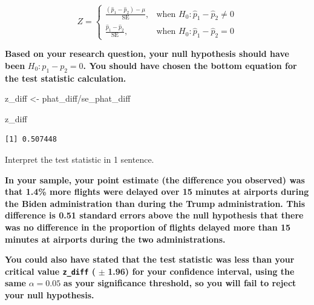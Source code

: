 \documentclass[
  letterpaper,
  DIV=11,
  numbers=noendperiod]{scrartcl}
\newenvironment{Shaded}{\begin{snugshade}}{\end{snugshade}}
\newcommand{\NormalTok}[1]{\textcolor[rgb]{0.00,0.23,0.31}{#1}}
\newcommand{\OtherTok}[1]{\textcolor[rgb]{0.00,0.23,0.31}{#1}}
\newcommand{\SpecialCharTok}[1]{\textcolor[rgb]{0.37,0.37,0.37}{#1}}
\begin{document}
\[
Z=
\begin{cases}
\frac{(\hat{p}_1-\hat{p}_2)-\mu}{\text{SE}}, & \text{when } H_0\colon \hat{p}_1-\hat{p}_2 \ne 0 \\
\frac{\hat{p}_1-\hat{p}_2}{\text{SE}}, & \text{when } H_0\colon \hat{p}_1-\hat{p}_2 = 0
\end{cases}
\]

\begin{tcolorbox}[enhanced jigsaw, colback=white, breakable, arc=.35mm, left=2mm, colframe=quarto-callout-warning-color-frame, opacityback=0, rightrule=.15mm, toprule=.15mm, bottomrule=.15mm, leftrule=.75mm]

\textbf{Based on your research question, your null hypothesis should
have been} \(H_0: p_1-p_2=0\)\textbf{. You should have chosen the bottom
equation for the test statistic calculation.}

\end{tcolorbox}

\begin{Shaded}
\begin{Highlighting}[]
\NormalTok{z\_diff }\OtherTok{\textless{}{-}}\NormalTok{ phat\_diff}\SpecialCharTok{/}\NormalTok{se\_phat\_diff}

\NormalTok{z\_diff}
\end{Highlighting}
\end{Shaded}

\begin{verbatim}
[1] 0.507448
\end{verbatim}

Interpret the test statistic in 1 sentence.

\begin{tcolorbox}[enhanced jigsaw, colback=white, breakable, arc=.35mm, left=2mm, colframe=quarto-callout-warning-color-frame, opacityback=0, rightrule=.15mm, toprule=.15mm, bottomrule=.15mm, leftrule=.75mm]

\textbf{In your sample, your point estimate (the difference you
observed) was that 1.4\% more flights were delayed over 15 minutes at
airports during the Biden administration than during the Trump
administration. This difference is 0.51 standard errors above the null
hypothesis that there was no difference in the proportion of flights
delayed more than 15 minutes at airports during the two
administrations.}

\textbf{You could also have stated that the test statistic was less than
your critical value \texttt{z\_diff} (} \(\pm\) \textbf{1.96) for your
confidence interval, using the same} \(\alpha=0.05\) \textbf{as your
significance threshold, so you will fail to reject your null
hypothesis.}

\end{tcolorbox}
\end{document}
